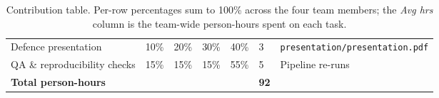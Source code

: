 \documentclass[11pt,a4paper]{article}
\begin{document}
\begin{table}[H]
\begin{tabular}{p{4.0cm}p{1.1cm}p{1.1cm}p{1.1cm}p{1.1cm}p{1.0cm}p{2.4cm}}
Defence presentation                   & 10\% & 20\% & 30\% & 40\% & 3  & \texttt{presentation/presentation.pdf} \\
QA \& reproducibility checks           & 15\% & 15\% & 15\% & 55\% & 5  & Pipeline re-runs \\
\midrule
\textbf{Total person-hours}            &      &      &      &      & \textbf{92} & \\
\bottomrule
\end{tabular}
\caption{Contribution table. Per-row percentages sum to 100\% across the
four team members; the \emph{Avg hrs} column is the team-wide
person-hours spent on each task.}
\end{table}



\end{document}
